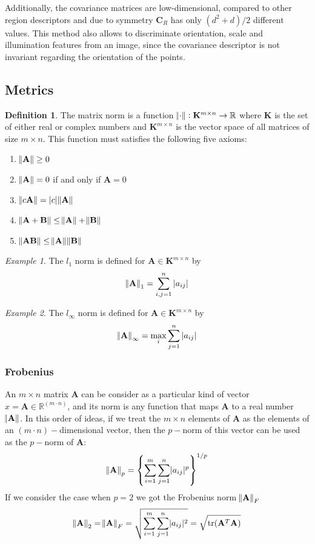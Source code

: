 \documentclass[11pt]{article}
\theoremstyle{definition}
\newtheorem{definition}{Definition}[section]
\theoremstyle{remark}
\theoremstyle{remark}
\theoremstyle{remark}
\newtheorem{example}{Example}
\newcommand{\R}{{\mathbb{R}}}
\begin{document}
Additionally, the covariance matrices are low-dimensional, compared to other
region descriptors and due to symmetry $\mathbf{C}_{R}$ has only
$\left(d^{2}+d\right) / 2$ different values. This method also allows to
discriminate orientation, scale and illumination features from an image, since
the covariance descriptor is not invariant regarding the orientation of the
points.

\subsection{Metrics}
\begin{definition}
  The matrix norm is a function $\norm{\cdot}: \mathbf{K}^{m \times n} \to \R$
  where $\mathbf{K}$ is the set of either real or complex numbers and
  $\mathbf{K}^{m \times n}$ is the vector space of all matrices of size
  $m \times n$. This function must satisfies the following five axioms:
  \begin{enumerate}
    \item $\norm{\mathbf{A}} \geq 0$
    \item $\norm{\mathbf{A}} = 0$ if and only if $\mathbf{A} = 0$
    \item $\norm{c\mathbf{A}} = |c|\norm{\mathbf{A}}$
    \item $\norm{\mathbf{A} + \mathbf{B}} \leq \norm{\mathbf{A}} + \norm{\mathbf{B}}$
    \item $\norm{\mathbf{AB}} \leq \norm{\mathbf{A}}\norm{\mathbf{B}}$
  \end{enumerate}
\end{definition}

\begin{example}
  The $l_{1}$ norm is defined for $\mathbf{A} \in \mathbf{K}^{m \times n}$ by
  \[
    \norm{\mathbf{A}}_{1} = \sum_{i,j = 1}^{n} |a_{ij}|
  \]
\end{example}

\begin{example}
  The $l_{\infty}$ norm is defined for $\mathbf{A} \in \mathbf{K}^{m \times n}$
  by
  \[
    \norm{\mathbf{A}}_{\infty} = \max_{i}{\sum_{j = 1}^{n} |a_{ij}|}
  \]
\end{example}

\subsubsection{Frobenius}
An $m \times n$ matrix $\mathbf{A}$ can be consider as a particular kind of
vector $x = \mathbf{A} \in \R^{(m\cdot n)}$, and its norm is any function that maps
$\mathbf{A}$ to a real number $\norm{\mathbf{A}}$. In this order of ideas, if we
treat the $m \times n$ elements of $\mathbf{A}$ as the elements of an
$(m\cdot n)-$dimensional vector, then the $p-$norm of this vector can be used as the
$p-$norm of $\mathbf{A}$:
%
\[
  \norm{\mathbf{A}}_{p} = \left\{ \sum_{i = 1}^{m} \sum_{j=1}^{n} \lvert a_{ij} \rvert^{p} \right\}^{1/p}
\]
%
If we consider the case when $p = 2$ we got the Frobenius norm
$\norm{\mathbf{A}}_{F}$
%
\[
  \norm{\mathbf{A}}_{2} = \norm{\mathbf{A}}_{F} = \sqrt{\sum_{i=1}^{m} \sum_{j=1}^{n} \lvert a_{ij} \rvert^{2}} = \sqrt{\mathrm{tr}(\mathbf{A}^{T}\mathbf{A})}
\]
\end{document}
